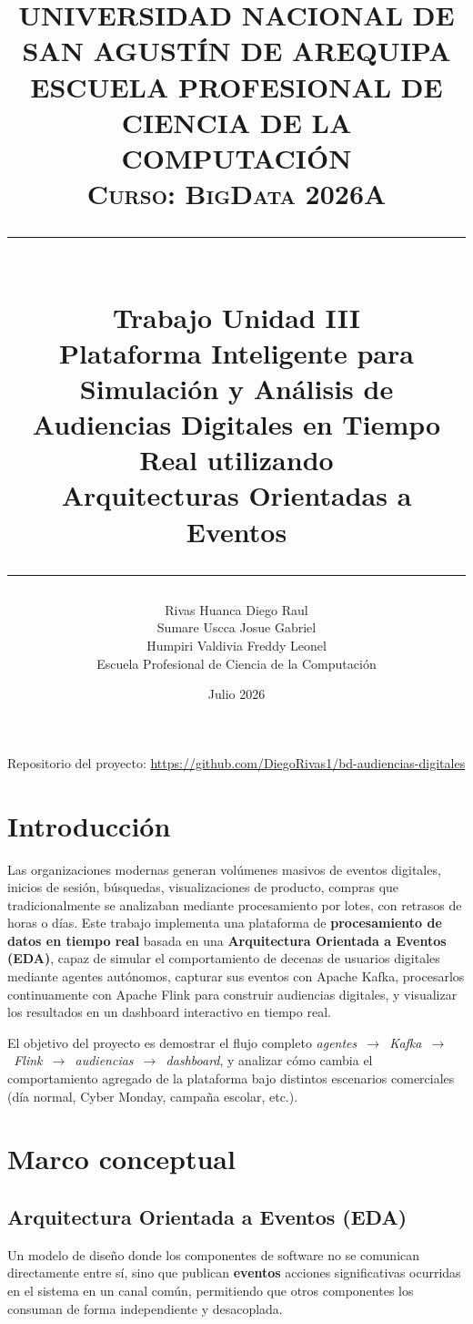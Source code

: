 \documentclass[11pt,a4paper]{article}
\title{
\vspace{-1cm}
\begin{center}
\textbf{UNIVERSIDAD NACIONAL DE SAN AGUST\'IN DE AREQUIPA}\\
\textbf{ESCUELA PROFESIONAL DE CIENCIA DE LA COMPUTACI\'ON}\\[0.2cm]
\textsc{Curso: BigData 2026A}\\[1cm]
\rule{\textwidth}{0.5pt}\\[0.3cm]
{\LARGE \textbf{Trabajo Unidad III}}\\[0.3cm]
{\Large Plataforma Inteligente para Simulaci\'on y An\'alisis de\\
Audiencias Digitales en Tiempo Real utilizando\\
Arquitecturas Orientadas a Eventos}\\[0.3cm]
\rule{\textwidth}{0.5pt}
\end{center}
}
\author{Rivas Huanca Diego Raul \\
Sumare Uscca Josue Gabriel \\
Humpiri Valdivia Freddy Leonel\\
Escuela Profesional de Ciencia de la Computaci\'on}
\date{Julio 2026}
\begin{document}
\begin{titlepage}
\maketitle
\thispagestyle{empty}
\vfill
\begin{center}
\small Repositorio del proyecto: \url{https://github.com/DiegoRivas1/bd-audiencias-digitales}
\end{center}
\end{titlepage}

\renewcommand{\contentsname}{Índice}

\tableofcontents
\newpage

\section{Introducci\'on}

Las organizaciones modernas generan volúmenes masivos de eventos digitales, inicios de sesión, búsquedas, visualizaciones de producto, compras que
tradicionalmente se analizaban mediante procesamiento por lotes, con
retrasos de horas o días. Este trabajo implementa una plataforma de
\textbf{procesamiento de datos en tiempo real} basada en una
\textbf{Arquitectura Orientada a Eventos (EDA)}, capaz de simular el
comportamiento de decenas de usuarios digitales mediante agentes
autónomos, capturar sus eventos con Apache Kafka, procesarlos
continuamente con Apache Flink para construir audiencias digitales, y
visualizar los resultados en un dashboard interactivo en tiempo real.

El objetivo del proyecto es demostrar el flujo completo
\emph{agentes~$\rightarrow$~Kafka~$\rightarrow$~Flink~$\rightarrow$~audiencias~$\rightarrow$~dashboard},
y analizar cómo cambia el comportamiento agregado de la plataforma bajo
distintos escenarios comerciales (día normal, Cyber Monday, campaña
escolar, etc.).

\section{Marco conceptual}

\subsection{Arquitectura Orientada a Eventos (EDA)}
Un modelo de diseño donde los componentes de software no se comunican
directamente entre sí, sino que publican \textbf{eventos} acciones
significativas ocurridas en el sistema en un canal común, permitiendo que
otros componentes los consuman de forma independiente y desacoplada.
\end{document}
